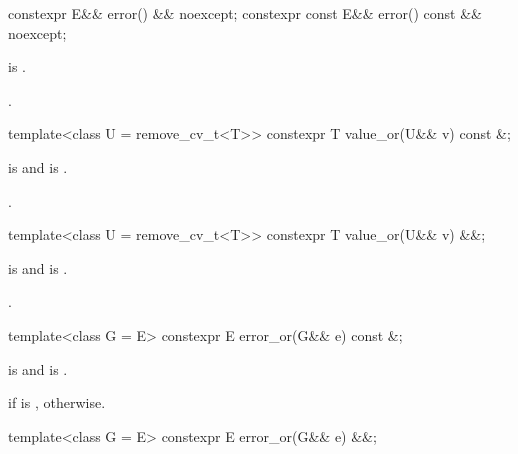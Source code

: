 %
\begin{itemdecl}
constexpr E&& error() && noexcept;
constexpr const E&& error() const && noexcept;
\end{itemdecl}

\begin{itemdescr}
\pnum
\hardexpects
{} is .

\pnum
\returns
{}.
\end{itemdescr}

%
\begin{itemdecl}
template<class U = remove_cv_t<T>> constexpr T value_or(U&& v) const &;
\end{itemdecl}

\begin{itemdescr}
\pnum
\mandates
{} is  and
 is .

\pnum
\returns
{}.
\end{itemdescr}

%
\begin{itemdecl}
template<class U = remove_cv_t<T>> constexpr T value_or(U&& v) &&;
\end{itemdecl}

\begin{itemdescr}
\pnum
\mandates
{} is  and
 is .

\pnum
\returns
{}.
\end{itemdescr}

%
\begin{itemdecl}
template<class G = E> constexpr E error_or(G&& e) const &;
\end{itemdecl}

\begin{itemdescr}
\pnum
\mandates
{} is  and
 is .

\pnum
\returns
{} if  is ,
 otherwise.
\end{itemdescr}

%
\begin{itemdecl}
template<class G = E> constexpr E error_or(G&& e) &&;
\end{itemdecl}


